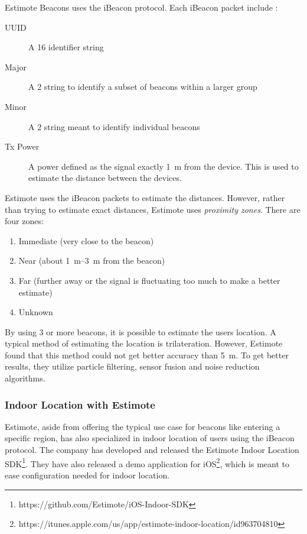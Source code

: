 Estimote Beacons uses the iBeacon protocol. 
Each iBeacon packet include \cite{IBEACON}:
\begin{description}
  \item[UUID] A \SI{16}{\byte} identifier string 
  \item[Major] A \SI{2}{\byte} string to identify a subset of beacons within a larger group
  \item[Minor] A \SI{2}{\byte} string meant to identify individual beacons
  \item[Tx Power] A power defined as the signal exactly \SI{1}{\meter} from the device. This is used to estimate the distance between the devices. 
\end{description}

Estimote uses the iBeacon packets to estimate the distances. 
However, rather than trying to estimate exact distances, 
Estimote uses \emph{proximity zones}. 
There are four zones:
\begin{enumerate}
  \item Immediate (very close to the beacon)
  \item Near (about \SIrange{1}{3}{\meter} from the beacon)
  \item Far (further away or the signal is fluctuating too much to make a better estimate)
  \item Unknown 
\end{enumerate}

By using \num{3} or more beacons, it is possible to estimate the users location. 
A typical method of estimating the location is trilateration. 
However, Estimote found that this method could not get better accuracy than \SI{5}{\meter}.
To get better results, 
they utilize particle filtering, sensor fusion and noise reduction algorithms.

\subsubsection{Indoor Location with Estimote}
Estimote, aside from offering the typical use case for beacons like entering a specific region, 
has also specialized in indoor location of users using the iBeacon protocol. 
The company has developed and released the Estimote Indoor Location SDK\footnote{https://github.com/Estimote/iOS-Indoor-SDK}.
They have also released a demo application for iOS\footnote{https://itunes.apple.com/us/app/estimote-indoor-location/id963704810}, 
which is meant to ease configuration needed for indoor location. 

